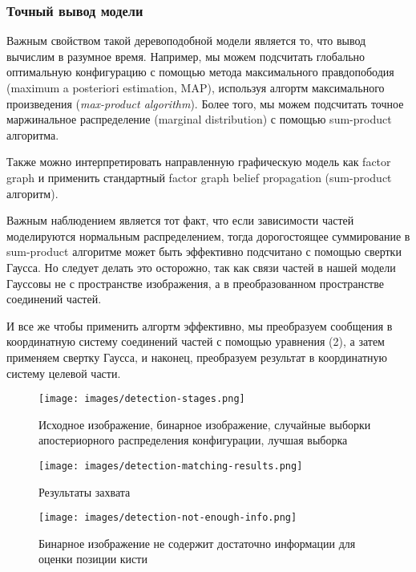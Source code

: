 \subsubsection{Точный вывод модели}

Важным свойством такой деревоподобной модели является то, что вывод вычислим в разумное время. Например, мы можем подсчитать глобально оптимальную конфигурацию с помощью метода максимального правдопободия (maximum a posteriori estimation, MAP), используя алгортм максимального произведения (\emph{max-product algorithm}). Более того, мы можем подсчитать точное маржинальное распределение (marginal distribution) с помощью sum-product алгоритма.

Также можно интерпретировать направленную графическую модель как factor graph и применить стандартный factor graph belief propagation (sum-product алгоритм).

Важным наблюдением является тот факт, что если зависимости частей моделируются нормальным распределением, тогда дорогостоящее суммирование в sum-product алгоритме может быть эффективно подсчитано с помощью свертки Гаусса. Но следует делать это осторожно, так как связи частей в нашей модели Гауссовы не с пространстве изображения, а в преобразованном пространстве соединений частей.

И все же чтобы применить алгортм эффективно, мы преобразуем сообщения в координатную систему соединений частей с помощью уравнения (2), а затем применяем свертку Гаусса, и наконец, преобразуем результат в координатную систему целевой части.

\begin{figure}
  \centering
  \texttt{[image: images/detection-stages.png]}
  \caption{Исходное изображение, бинарное изображение, случайные выборки апостериорного распределения конфигурации, лучшая выборка\label{detection-stages}}
\end{figure}

\begin{figure}
  \centering
  \texttt{[image: images/detection-matching-results.png]}
  \caption{Результаты захвата\label{detection-matching-results}}
\end{figure}

\begin{figure}
  \centering
  \texttt{[image: images/detection-not-enough-info.png]}
  \caption{Бинарное изображение не содержит достаточно информации для оценки позиции кисти\label{detection-not-enough-info}}
\end{figure}

